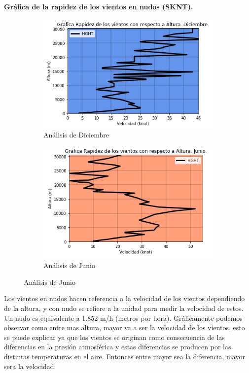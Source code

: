 \documentclass[12pt]{article}
\begin{document}
\noindent\textbf{Gráfica de la rapidez de los vientos en nudos (SKNT).} 
\begin{figure}[h!]
\begin{subfigure}{.55\textwidth}
  \centering
  \includegraphics[width=.8\linewidth]{GrafAVDec.png}
  \caption{Análisis de Diciembre}
  \label{fig:sfig1}
\end{subfigure}
\begin{subfigure}{.55\textwidth}
  \centering
  \includegraphics[width=.8\linewidth]{GrafAVJun.png}
  \caption{Análisis de Junio}
  \label{fig:sfig2}
\end{subfigure}
\end{figure}

Los vientos en nudos hacen referencia a la velocidad de los vientos dependiendo de la altura, y con nudo se refiere a la unidad para medir la velocidad de estos. Un nudo es equivalente a  1.852 m/h (metros por hora). Gráficamente podemos observar como entre mas altura, mayor va a ser la velocidad de los vientos, esto se puede explicar ya que los vientos se originan como consecuencia de las diferencias en la presión atmosférica y estas diferencias se producen por las distintas temperaturas en el aire. Entonces entre mayor sea la diferencia, mayor sera la velocidad. \\
\end{document}
